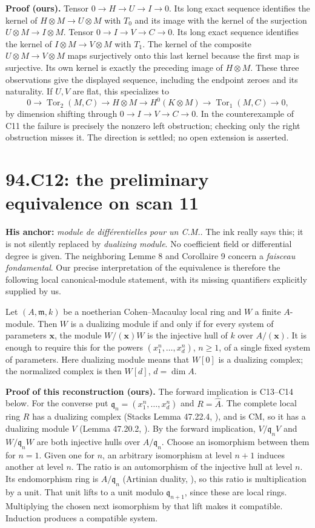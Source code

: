 \documentclass[11pt]{article}
\newcommand{\Tor}{\operatorname{Tor}}
\newcommand{\m}{\mathfrak m}
\begin{document}
\textbf{Proof (ours).}
Tensor $0\to H\to U\to I\to0$. Its long exact sequence identifies
the kernel of $H\otimes M\to U\otimes M$ with $T_0$ and its image
with the kernel of the surjection $U\otimes M\to I\otimes M$.
Tensor $0\to I\to V\to C\to0$. Its long exact sequence identifies
the kernel of $I\otimes M\to V\otimes M$ with $T_1$.
The kernel of the composite $U\otimes M\to V\otimes M$ maps
surjectively onto this last kernel because the first map is
surjective. Its own kernel is exactly the preceding image of
$H\otimes M$. These three observations give the displayed sequence,
including the endpoint zeroes and its naturality.
If $U,V$ are flat, this specializes to
\[
 0\to\Tor_2(M,C)\to H\otimes M\to H^0(K\otimes M)
 \to\Tor_1(M,C)\to0,
\]
by dimension shifting through $0\to I\to V\to C\to0$.
In the counterexample of C11 the failure is precisely the nonzero
left obstruction; checking only the right obstruction misses it.
The direction is settled; no open extension is asserted.

\section{94.C12: the preliminary equivalence on scan 11}
\label{C12}
\textbf{His anchor:} \emph{module de diff\'erentielles pour un C.M.}.
The ink really says this; it is not silently replaced by
\emph{dualizing module}. No coefficient field or differential degree
is given. The neighboring Lemme 8 and Corollaire 9 concern a
\emph{faisceau fondamental}. Our precise interpretation of the
equivalence is therefore the following local canonical-module
statement, with its missing quantifiers explicitly supplied by us.

Let $(A,\m,k)$ be a noetherian Cohen--Macaulay local ring and $W$ a
finite $A$-module. Then $W$ is a dualizing module if and only if for
every system of parameters $\mathbf x$, the module
$W/(\mathbf x)W$ is the injective hull of $k$ over $A/(\mathbf x)$.
It is enough to require this for the powers
$(x_1^n,\ldots,x_d^n)$, $n\ge1$, of a single fixed system of parameters.
Here dualizing module means that $W[0]$ is a dualizing complex;
the normalized complex is then $W[d]$, $d=\dim A$.

\textbf{Proof of this reconstruction (ours).}
The forward implication is C13--C14 below. For the converse put
$\mathfrak q_n=(x_1^n,\ldots,x_d^n)$ and $R=\widehat A$.
The complete local ring $R$ has a dualizing complex
(Stacks Lemma 47.22.4, \cite{StacksDualizingComplete}), and is CM,
so it has a dualizing module $V$ (Lemma 47.20.2,
\cite{StacksDualizingCM}). By the forward implication,
$V/\mathfrak q_nV$ and $W/\mathfrak q_nW$ are both injective hulls
over $A/\mathfrak q_n$. Choose an isomorphism between them for $n=1$.
Given one for $n$, an arbitrary isomorphism at level $n+1$ induces
another at level $n$. The ratio is an automorphism of the injective
hull at level $n$. Its endomorphism ring is $A/\mathfrak q_n$
(Artinian duality, \cite{StacksArtinDuality}), so this ratio is
multiplication by a unit. That unit lifts to a unit modulo
$\mathfrak q_{n+1}$, since these are local rings. Multiplying the
chosen next isomorphism by that lift makes it compatible. Induction
produces a compatible system.
\end{document}

